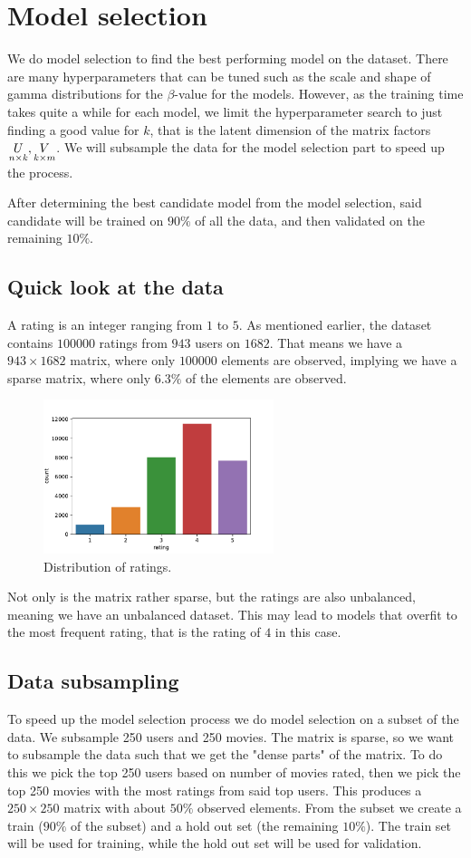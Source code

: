 \documentclass[12pt]{article}
\begin{document}
\section{Model selection}
We do model selection to find the best performing model on the dataset. There are many hyperparameters that can be tuned such as the scale and shape of gamma distributions for the $\beta$-value for the models. However, as the training time takes quite a while for each model, we limit the hyperparameter search to just finding a good value for $k$, that is the latent dimension of the matrix factors $\underset{n \times k}{U}, \underset{k \times m}{V}$. We will subsample the data for the model selection part to speed up the process.

After determining the best candidate model from the model selection, said candidate will be trained on $90\%$ of all the data, and then validated on the remaining $10\%$.

    \subsection*{Quick look at the data}
    A rating is an integer ranging from $1$ to $5$. As mentioned earlier, the dataset contains $100 000$ ratings from $943$ users on $1682$. That means we have a $943 \times 1682$ matrix, where only $100000$ elements are observed, implying we have a sparse matrix, where only $6.3\%$ of the elements are observed.  
    \begin{figure}[H]
        \centering
        \caption{Distribution of ratings.}
        \includegraphics[width=0.6\textwidth]{ratings.pdf}
    \end{figure}
    Not only is the matrix rather sparse, but the ratings are also unbalanced, meaning we have an unbalanced dataset. This may lead to models that overfit to the most frequent rating, that is the rating of $4$ in this case.

    \subsection{Data subsampling}
    To speed up the model selection process we do model selection on a subset of the data. We subsample 250 users and 250 movies. The matrix is sparse, so we want to subsample the data such that we get the "dense parts" of the matrix. To do this we pick the top 250 users based on number of movies rated, then we pick the top 250 movies with the most ratings from said top users. This produces a $250 \times 250$ matrix with about $50\%$ observed elements. From the subset we create a train ($90\%$ of the subset) and a hold out set (the remaining $10\%$). The train set will be used for training, while the hold out set will be used for validation.
\end{document}
